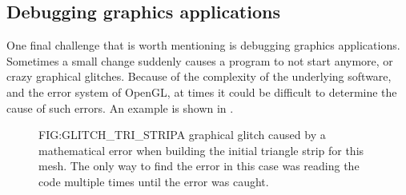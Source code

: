 \subsection{Debugging graphics applications}

One final challenge that is worth mentioning is debugging graphics applications.
Sometimes a small change suddenly causes a program to not start anymore,
or crazy graphical glitches.
Because of the complexity of the underlying software,
and the error system of OpenGL,
at times it could be difficult to determine the cause of such errors.
An example is shown in .

\begin{figure}[Graphical glitch \textemdash Triangle strip]{FIG:GLITCH_TRI_STRIP}{A graphical glitch caused by a mathematical error when building the initial triangle strip for this mesh. The only way to find the error in this case was reading the code multiple times until the error was caught.}
\end{figure}

  
